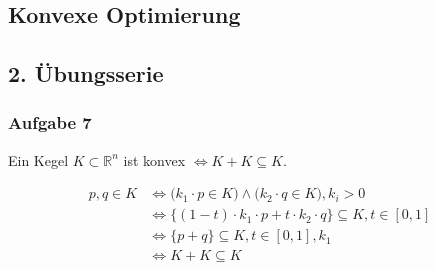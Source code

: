 \documentclass{article}
\begin{document}
\begin{center}
	\section*{Konvexe Optimierung}
	\subsection*{2. Übungsserie}
\end{center}

\subsubsection*{Aufgabe 7}
\begin{center}
Ein Kegel $K \subset  \mathbb{R}^n$ ist konvex $\Leftrightarrow K + K \subseteq K$.
\end{center}


\begin{equation*}
\begin{split}
p,q \in K &\Leftrightarrow \big(k_1 \cdot p \in K\big) \land \big(k_2 \cdot q \in K\big) ,k_i > 0\\
&\Leftrightarrow \{ (1-t)\cdot k_1\cdot p + t\cdot k_2\cdot q \} \subseteq K,t \in \left[0,1 \right]\\
&\Leftrightarrow \{ p + q \} \subseteq K,t \in \left[0,1 \right],k_1\\
&\Leftrightarrow K + K \subseteq K
\end{split}
\end{equation*}



%
%
%
%
\end{document}
